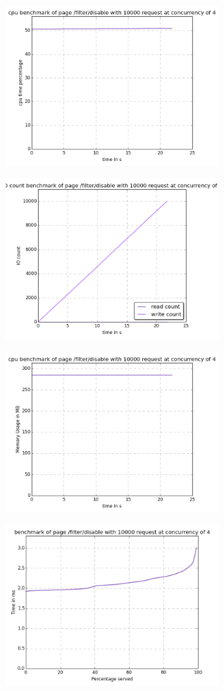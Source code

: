 \begin{center}
\includegraphics[width=0.6\textwidth]{img/filter.disable.cpu.png}



\includegraphics[width=0.6\textwidth]{img/filter.disable.io-count.png}



\includegraphics[width=0.6\textwidth]{img/filter.disable.mem.png}



\includegraphics[width=0.6\textwidth]{img/filter.disable.serv-time.png}




\end{center}
